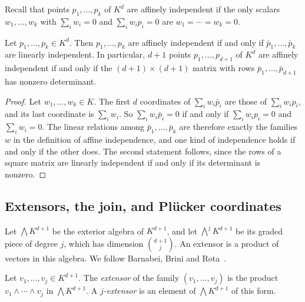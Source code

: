 Recall that points $p_1, \dots, p_k$ of $K^d$ are affinely
independent if the only scalars $w_1, \dots, w_k$ with
$\sum_i w_i = 0$ and $\sum_i w_i p_i = 0$ are
$w_1 = \cdots = w_k = 0$.

\begin{lemma}
  \label{lem:affine-indep-iff}
  \leanok
  Let $p_1, \dots, p_k \in K^d$. Then $p_1, \dots, p_k$ are affinely
  independent if and only if $\bar p_1, \dots, \bar p_k$ are linearly
  independent. In particular, $d+1$ points $p_1, \dots, p_{d+1}$ of
  $K^d$ are affinely independent if and only if the
  $(d+1) \times (d+1)$ matrix with rows $\bar p_1, \dots, \bar p_{d+1}$
  has nonzero determinant.
\end{lemma}
\begin{proof}
  \leanok
  Let $w_1, \dots, w_k \in K$. The first $d$ coordinates of
  $\sum_i w_i \bar p_i$ are those of $\sum_i w_i p_i$, and its last
  coordinate is $\sum_i w_i$. So $\sum_i w_i \bar p_i = 0$ if and only
  if $\sum_i w_i p_i = 0$ and $\sum_i w_i = 0$. The linear relations
  among $\bar p_1, \dots, \bar p_k$ are therefore exactly the families
  $w$ in the definition of affine independence, and one kind of
  independence holds if and only if the other does. The second
  statement follows, since the rows of a square matrix are linearly
  independent if and only if its determinant is nonzero.
\end{proof}

\subsection{Extensors, the join, and Plücker coordinates}
\label{sec:molecular-extensor}

Let $\bigwedge K^{d+1}$ be the exterior algebra of $K^{d+1}$, and let
$\bigwedge^j K^{d+1}$ be its graded piece of degree $j$, which has
dimension $\binom{d+1}{j}$. An extensor is a product of vectors in this
algebra. We follow Barnabei, Brini and
Rota~\cite[\S3]{barnabeiBriniRota1985}.

\begin{definition}[Extensor]
  \label{def:extensor}
  \leanok
  Let $v_1, \dots, v_j \in K^{d+1}$. The \emph{extensor} of the family
  $(v_1, \dots, v_j)$ is the product $v_1 \wedge \cdots \wedge v_j$ in
  $\bigwedge K^{d+1}$. A \emph{$j$-extensor} is an element of
  $\bigwedge K^{d+1}$ of this form.
\end{definition}

